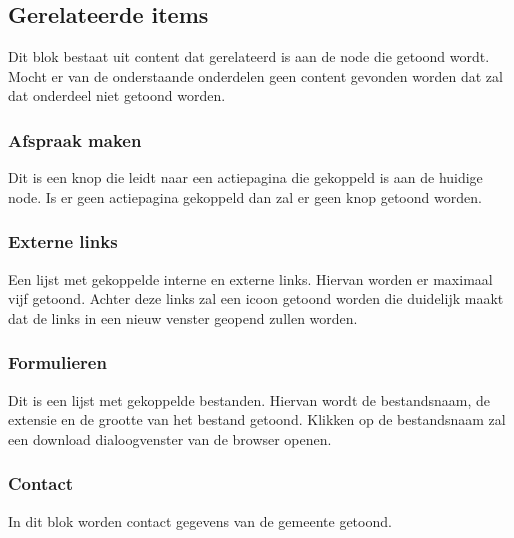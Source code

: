 \subsection{Gerelateerde items}
\label{sec:gerelateerdeitems}
Dit blok bestaat uit content dat gerelateerd is aan de node die getoond wordt. Mocht er van de onderstaande onderdelen geen content gevonden worden dat zal dat onderdeel niet getoond worden.

\subsubsection{Afspraak maken}
\label{sec:afspraakmaken}
Dit is een knop die leidt naar een actiepagina die gekoppeld is aan de huidige node. Is er geen actiepagina gekoppeld dan zal er geen knop getoond worden.

\subsubsection{Externe links}
\label{sec:externelinks}
Een lijst met gekoppelde interne en externe links. Hiervan worden er maximaal vijf getoond. Achter deze links zal een icoon getoond worden die duidelijk maakt dat de links in een nieuw venster geopend zullen worden.

\subsubsection{Formulieren}
\label{sec:formulieren}
Dit is een lijst met gekoppelde bestanden. Hiervan wordt de bestandsnaam, de extensie en de grootte van het bestand getoond. Klikken op de bestandsnaam zal een download dialoogvenster van de browser openen.

\subsubsection{Contact}
\label{sec:contact}
In dit blok worden contact gegevens van de gemeente getoond.